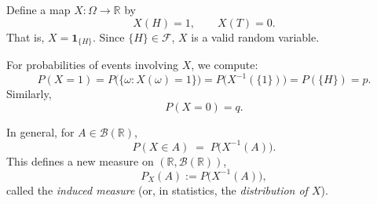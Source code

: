 \documentclass[11pt]{article}
\theoremstyle{definition}
\begin{document}
Define a map $X:\Omega \to \mathbb{R}$ by
\[
X(H)=1, \qquad X(T)=0.
\]
That is, $X = \mathbf{1}_{\{H\}}$. Since $\{H\}\in\mathcal{F}$, $X$ is a valid random variable.

\medskip

For probabilities of events involving $X$, we compute:
\[
P(X=1) = P\big(\{\omega : X(\omega)=1\}\big) 
= P\big(X^{-1}(\{1\})\big)
= P(\{H\}) = p.
\]
Similarly,
\[
P(X=0) = q.
\]

\medskip

In general, for $A \in \mathcal{B}(\mathbb{R})$,
\[
P(X \in A) \;=\; P\big(X^{-1}(A)\big).
\]
This defines a new measure on $(\mathbb{R},\mathcal{B}(\mathbb{R}))$,
\[
P_X(A) := P\big(X^{-1}(A)\big),
\]
called the \emph{induced measure} (or, in statistics, the \emph{distribution of $X$}).
\end{document}
